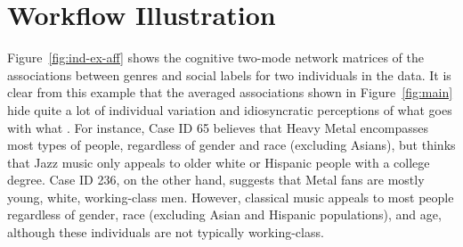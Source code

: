\documentclass[12pt]{article}
\begin{document}
\section*{Workflow Illustration}
Figure~\ref{fig:ind-ex-aff} shows the cognitive two-mode network matrices of the associations between genres and social labels for two individuals in the data. It is clear from this example that the averaged associations shown in Figure~\ref{fig:main} hide quite a lot of individual variation and idiosyncratic perceptions of what goes with what \citep{goldberg2018beyond-f2f}. For instance, Case ID 65 believes that Heavy Metal encompasses most types of people, regardless of gender and race (excluding Asians), but thinks that Jazz music only appeals to older white or Hispanic people with a college degree. Case ID 236, on the other hand, suggests that Metal fans are mostly young, white, working-class men. However, classical music appeals to most people regardless of gender, race (excluding Asian and Hispanic populations), and age, although these individuals are not typically working-class.  
\end{document}

